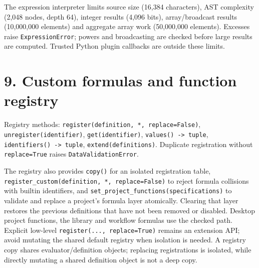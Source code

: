 \documentclass[
  10pt,
  a4paper,
  oneside]{scrreprt}
\begin{document}
The expression interpreter limits source size (16,384 characters), AST
complexity (2,048 nodes, depth 64), integer results (4,096 bits),
array/broadcast results (10,000,000 elements) and aggregate array work
(50,000,000 elements). Excesses raise \texttt{ExpressionError}; powers
and broadcasting are checked before large results are computed. Trusted
Python plugin callbacks are outside these limits.

\hypertarget{custom-formulas-and-function-registry}{%
\section{9. Custom formulas and function
registry}\label{custom-formulas-and-function-registry}}

Registry methods: \texttt{register(definition,\ *,\ replace=False)},
\texttt{unregister(identifier)}, \texttt{get(identifier)},
\texttt{values()\ -\textgreater{}\ tuple},
\texttt{identifiers()\ -\textgreater{}\ tuple},
\texttt{extend(definitions)}. Duplicate registration without
\texttt{replace=True} raises \texttt{DataValidationError}.

The registry also provides \texttt{copy()} for an isolated registration
table, \texttt{register\_custom(definition,\ *,\ replace=False)} to
reject formula collisions with builtin identifiers, and
\texttt{set\_project\_functions(specifications)} to validate and replace
a project's formula layer atomically. Clearing that layer restores the
previous definitions that have not been removed or disabled. Desktop
project functions, the library and workflow formulas use the checked
path. Explicit low-level \texttt{register(...,\ replace=True)} remains
an extension API; avoid mutating the shared default registry when
isolation is needed. A registry copy shares evaluator/definition
objects; replacing registrations is isolated, while directly mutating a
shared definition object is not a deep copy.
\end{document}
